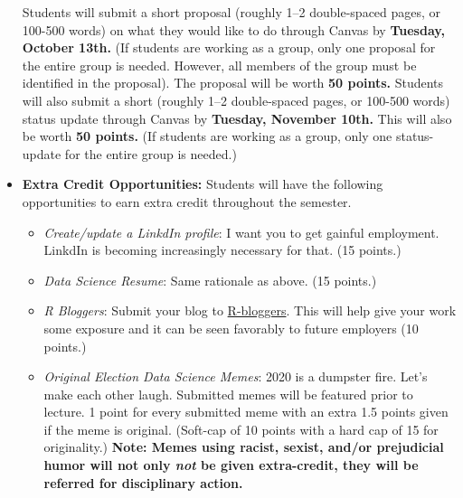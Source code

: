 \documentclass[11pt]{article}
\begin{document}
\begin{itemize}
Students will submit a short proposal (roughly 1--2 double-spaced pages, or 100-500 words) on what they would like to do through Canvas by \textbf{Tuesday, October 13th.} (If students are working as a group, only one proposal for the entire group is needed. However, all members of the group must be identified in the proposal). The proposal will be worth \textbf{50 points.} Students will also submit a short (roughly 1--2 double-spaced pages, or 100-500 words) status update through Canvas by \textbf{Tuesday, November 10th.} This will also be worth \textbf{50 points.} (If students are working as a group, only one status-update for the entire group is needed.)

\item \textbf{Extra Credit Opportunities:} Students will have the following opportunities to earn extra credit throughout the semester. 
\begin{itemize}
\item \textit{Create/update a LinkdIn profile}: I want you to get gainful employment. LinkdIn is becoming increasingly necessary for that. (15 points.)
\item \textit{Data Science Resume}: Same rationale as above. (15 points.)
\item \textit{R Bloggers}: Submit your blog to \href{https://www.r-bloggers.com/}{R-bloggers}. This will help give your work some exposure and it can be seen favorably to future employers (10 points.)
\item \textit{Original Election Data Science Memes}: 2020 is a dumpster fire. Let's make each other laugh. Submitted memes will be featured prior to lecture. 1 point for every submitted meme with an extra 1.5 points given if the meme is original. (Soft-cap of 10 points with a hard cap of 15 for originality.) \textbf{Note: Memes using racist, sexist, and/or prejudicial humor will not only \textit{not} be given extra-credit, they will be referred for disciplinary action.}
\end{itemize}
\end{itemize}
\end{document}
